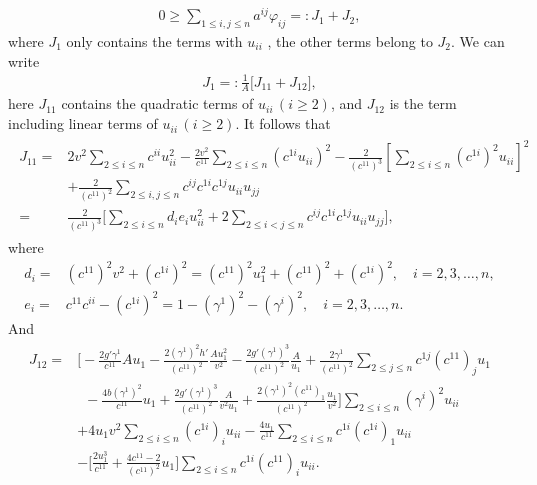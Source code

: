 \documentclass[11pt]{amsart}
\numberwithin{equation}{section}
\begin{document}
\begin{align}\label{3.51}
0\geq \sum_{1\leq i,j\leq n}a^{ij}\varphi_{ij}=: J_1+J_2,
\end{align}
where $J_1$  only contains the terms with $u_{ii}$ , the other terms belong to $J_2$. We can write
\begin{align}\label{3.52}
J_1=:\frac{1}{A}\big[J_{11}+J_{12}\big],
\end{align}
here $J_{11}$  contains the quadratic terms of $u_{ii}\,(i\geq2)$, and  $J_{12}$ is the term including linear terms of $u_{ii}\,(i\geq2)$. It follows that
\begin{align}\label{3.54}
\begin{split}
J_{11}=&2v^2\sum_{2\leq i\leq n}c^{ii}u_{ii}^2-\frac{2v^2}{c^{11}}\sum_{2\leq i\leq n}(c^{1i}u_{ii})^2-\frac{2}{(c^{11})^3}[\sum_{2\leq i\leq n}(c^{1i})^2u_{ii}]^2\\&+\frac{2}{(c^{11})^2}\sum_{2\leq i,j\leq n}c^{ij}c^{1i}c^{1j}u_{ii}u_{jj}\\
=&\frac{2}{(c^{11})^3}\big[\sum_{2\leq i\leq n}d_ie_iu_{ii}^2+2\sum_{2\leq i<j\leq n}c^{ij}c^{1i}c^{1j}u_{ii}u_{jj}\big],
\end{split}
\end{align}
where
\begin{align}
d_i=&(c^{11})^2v^2+(c^{1i})^2=(c^{11})^2u_1^2+(c^{11})^2+(c^{1i})^2, \quad i=2,3,\ldots,n,\label{3.55}\\
e_i=&c^{11}c^{ii}-(c^{1i})^2=1-(\gamma^1)^2-(\gamma^i)^2,\quad i=2,3,\ldots,n.\label{3.56}
\end{align}
And \begin{align}\label{3.57}
\begin{split}
J_{12}=&\big[-\frac{2g'\gamma^1}{c^{11}}Au_1-\frac{2(\gamma^1)^2h'}{(c^{11})^2}\frac{Au_1^2}{v^2}
-\frac{2g'(\gamma^1)^3}{(c^{11})^2}\frac{A}{u_1}
+\frac{2\gamma^1}{(c^{11})^2}\sum_{2\leq j\leq n}c^{1j}(c^{11})_ju_1\\&\,\,\,-\frac{4b(\gamma^1)^2}{c^{11}}u_1+\frac{2g'(\gamma^1)^3}{(c^{11})^2}\frac{A}{v^2u_1}
+\frac{2(\gamma^1)^2(c^{11})_1}{(c^{11})^2}\frac{u_1}{v^2}\big]\sum_{2\leq i\leq n} (\gamma^i)^2u_{ii}\\&+4u_1v^2\sum_{2\leq i\leq n}(c^{1i})_{i}u_{ii}-\frac{4u_1}{c^{11}}\sum_{2\leq i\leq n}c^{1i}(c^{1i})_1u_{ii}\\&
-\big[\frac{2u_1^3}{c^{11}}+\frac{4c^{11}-2}{(c^{11})^2}u_1\big]\sum_{2\leq i\leq n}c^{1i}(c^{11})_i u_{ii}.
\end{split}
\end{align}
\end{document}
